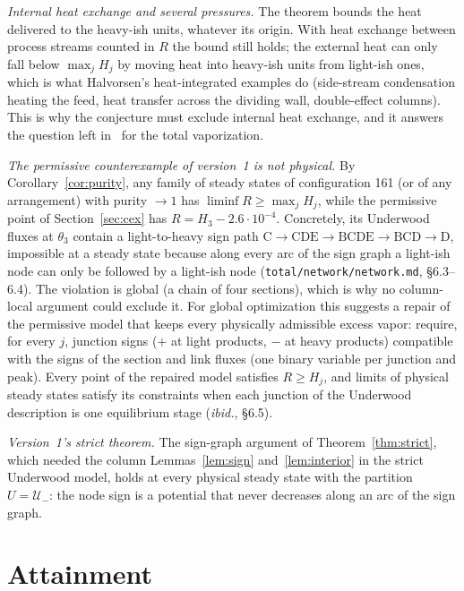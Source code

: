 \emph{Internal heat exchange and several pressures.} The theorem bounds the heat delivered to the heavy-ish units,
whatever its origin. With heat exchange between process streams counted in $R$ the bound still holds; the external
heat can only fall below $\max_jH_j$ by moving heat into heavy-ish units from light-ish ones, which is what
Halvorsen's heat-integrated examples do (side-stream condensation heating the feed, heat transfer across the dividing
wall, double-effect columns). This is why the conjecture must exclude internal heat exchange, and it answers the
question left in~\autocite{HS02} for the total vaporization.

\emph{The permissive counterexample of version~1 is not physical.} By Corollary~\ref{cor:purity}, any family of steady
states of configuration 161 (or of any arrangement) with purity $\to1$ has $\liminf R\ge\max_jH_j$, while the permissive
point of Section~\ref{sec:cex} has $R=H_3-2.6\cdot10^{-4}$. Concretely, its Underwood fluxes at $\theta_3$ contain a
light-to-heavy sign path $\mathrm C\to\mathrm{CDE}\to\mathrm{BCDE}\to\mathrm{BCD}\to\mathrm D$, impossible at a steady state because
along every arc of the sign graph a light-ish node can only be followed by a light-ish node
(\texttt{total/network/network.md}, \S6.3--6.4). The violation is global (a chain of four sections), which is why no
column-local argument could exclude it. For global optimization this suggests a repair of the permissive model that
keeps every physically admissible excess vapor: require, for every $j$, junction signs ($+$ at light products, $-$ at
heavy products) compatible with the signs of the section and link fluxes (one binary variable per junction and peak).
Every point of the repaired model satisfies $R\ge H_j$, and limits of physical steady states satisfy its constraints
when each junction of the Underwood description is one equilibrium stage (\emph{ibid.}, \S6.5).

\emph{Version~1's strict theorem.} The sign-graph argument of Theorem~\ref{thm:strict}, which needed the column
Lemmas~\ref{lem:sign} and~\ref{lem:interior} in the strict Underwood model, holds at every physical steady state with the
partition $U=\mathcal U_-$: the node sign is a potential that never decreases along an arc of the sign graph.

\section{Attainment}\label{sec:attain}

